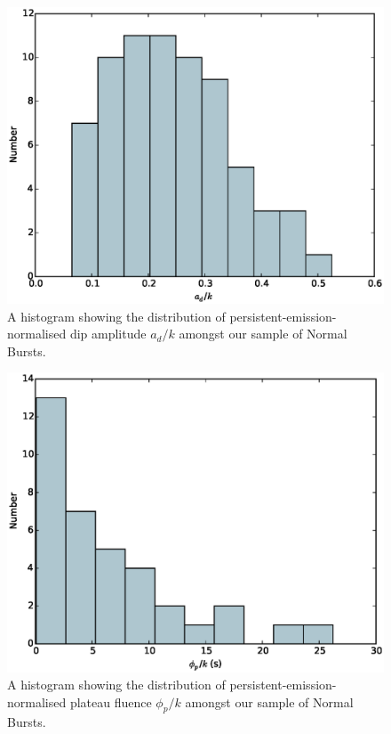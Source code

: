 \begin{figure}
  \centering
  \includegraphics[width=.9\linewidth, trim={0cm 0 0cm 0},clip]{images/appendix_dip_pa_n_hist.eps}
  \caption{\small A histogram showing the distribution of persistent-emission-normalised dip amplitude $a_d/k$ amongst our sample of Normal Bursts.}
  \label{fig:app_hist_ad_n}
\end{figure}

\begin{figure}
  \centering
  \includegraphics[width=.9\linewidth, trim={0cm 0 0cm 0},clip]{images/appendix_plat_aafluence_n_hist.eps}
  \caption{\small A histogram showing the distribution of persistent-emission-normalised plateau fluence $\phi_p/k$ amongst our sample of Normal Bursts.}
  \label{fig:app_hist_phip_n}
\end{figure}

